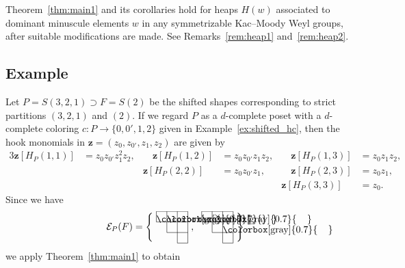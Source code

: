 \documentclass[ALCO,ThmDefs,Unicode,epreuves]{cedram}
\newcommand\vectz{\boldsymbol{z}}
\begin{document}
\begin{rema}
\label{rem:heap3}
Theorem~\ref{thm:main1} and its corollaries hold for heaps $H(w)$ associated 
to dominant minuscule elements $w$ in any symmetrizable Kac--Moody Weyl groups, 
after suitable modifications are made.
See Remarks~\ref{rem:heap1} and~\ref{rem:heap2}.
\end{rema}

\subsection{%
Example
}

\begin{exam}
\label{ex:dc}
Let $P = S(3,2,1) \supset F = S(2)$ be the shifted shapes corresponding 
to strict partitions $(3,2,1)$ and $(2)$.
If we regard $P$ as a $d$-complete poset with a $d$-complete coloring $c : P \to \{ 0, 0', 1, 2 \}$ 
given in Example~\ref{ex:shifted_hc}, 
then the hook monomials in 
${{\vectz}} = (z_0, z_{0'}, z_1, z_2)$ are given by
\begin{alignat*}{3}
{{\vectz}}[ H_P(1,1) ] &= z_0 z_{0'} z_1^2 z_2,
&\quad
{{\vectz}}[ H_P(1,2) ] &= z_0 z_{0'} z_1 z_2,
&\quad
{{\vectz}}[ H_P(1,3) ] &= z_0 z_1 z_2,
\\
&
&
{{\vectz}}[ H_P(2,2) ] &= z_0 z_{0'} z_1,
&\quad
{{\vectz}}[ H_P(2,3) ] &= z_0 z_1,
\\
&
&
&
&{{\vectz}}[ H_P(3,3) ] &= z_0.
\end{alignat*}
Since we have
$$
\setlength{\unitlength}{1.1pt}
\mathcal{E}_P(F)
 =
\left\{
\raisebox{-14pt}{
\begin{picture}(30,30)
\fboxsep=0mm
\put(0,20){\colorbox[gray]{0.7}{\makebox(10,10){}}}
\put(10,20){\colorbox[gray]{0.7}{\makebox(10,10){}}}
\put(0,30){\line(1,0){30}}
\put(0,20){\line(1,0){30}}
\put(10,10){\line(1,0){20}}
\put(20,0){\line(1,0){10}}
\put(0,20){\line(0,1){10}}
\put(10,10){\line(0,1){20}}
\put(20,0){\line(0,1){30}}
\put(30,0){\line(0,1){30}}
\end{picture}
},
\ 
\raisebox{-14pt}{
\begin{picture}(30,30)
\fboxsep=0mm
\put(0,20){\colorbox[gray]{0.7}{\makebox(10,10){}}}
\put(20,10){\colorbox[gray]{0.7}{\makebox(10,10){}}}
\put(0,30){\line(1,0){30}}
\put(0,20){\line(1,0){30}}
\put(10,10){\line(1,0){20}}
\put(20,0){\line(1,0){10}}
\put(0,20){\line(0,1){10}}
\put(10,10){\line(0,1){20}}
\put(20,0){\line(0,1){30}}
\put(30,0){\line(0,1){30}}
\put(10,20){\makebox(10,10){$\times$}}
\end{picture}
}
\right\},
$$
we apply Theorem~\ref{thm:main1} to obtain

\end{exam}
\end{document}
